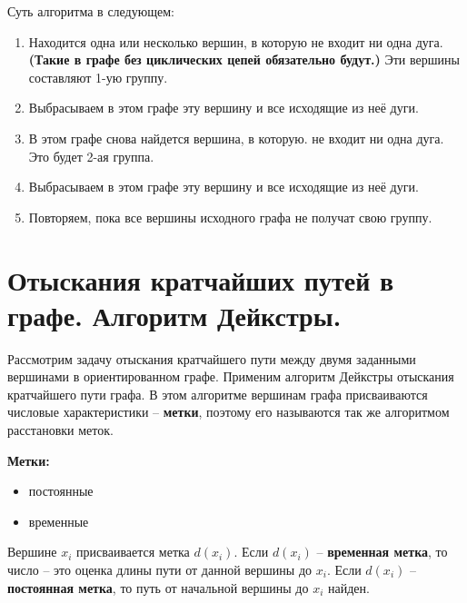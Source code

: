 \documentclass[12pt, a4paper, oneside]{article}
\theoremstyle{plain} %
\theoremstyle{definition}
\newcommand{\indef}[1]{\textbf{ \color{dark_red} #1}}
\begin{document}
Суть алгоритма в следующем:
\begin{enumerate}

\item  Находится одна или несколько вершин, в которую не входит ни одна дуга. \textbf{(Такие в графе без циклических цепей обязательно будут.)} Эти вершины составляют 1-ую группу.

\item Выбрасываем в этом графе эту вершину и все исходящие из неё дуги. 

\item В этом графе снова найдется вершина, в которую. не входит ни одна дуга. Это будет 2-ая группа.

\item Выбрасываем в этом графе эту вершину и все исходящие из неё дуги.

\item Повторяем, пока все вершины исходного графа не получат свою группу. 

\end{enumerate}


\section{Отыскания кратчайших путей в графе. Алгоритм Дейкстры.}

Рассмотрим задачу отыскания кратчайшего пути между двумя заданными вершинами в ориентированном графе. Применим алгоритм Дейкстры отыскания кратчайшего пути графа. В этом алгоритме вершинам графа присваиваются числовые характеристики – \indef{метки}, поэтому его называются так же алгоритмом расстановки меток.

\textbf{Метки:}

\begin{itemize}
    
    \item постоянные  
    
    \item временные

\end{itemize}

Вершине \textbf{$x_i$} присваивается метка \textbf{$d(x_i)$}. Если \textbf{$d(x_i)$} – \indef{временная метка}, то число – это оценка длины пути от данной вершины до \textbf{$x_i$}. Если \textbf{$d(x_i)$} – \indef{постоянная метка}, то путь от начальной вершины до \textbf{$x_i$} найден.
\end{document}
